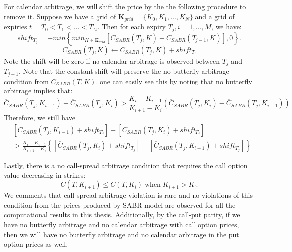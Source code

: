 \documentclass[letterpaper,12pt,titlepage,oneside,final]{book}
\numberwithin{equation}{section}
\theoremstyle{definition}
\begin{document}
For calendar arbitrage, we will shift the price by the the following procedure to remove it. Suppose we have a grid of $\mathbf{K}_{grid}=\{K_0,K_1,\dots,K_{N}\}$ and  a grid of expiries $t=T_0 < T_1 < \dots< T_{M}$. Then for each expiry  $T_j,i=1,\dots,M$, we have:
\[
shift_{T_j}=-min\left\{min_{K \in \mathbf{K}_{grid}}\left[\overline{C}_{SABR}(T_j,K)-\overline{C}_{SABR}(T_{j-1},K)\right],0\right\}.	
\]
\[
\widetilde {C_{SABR}}(T_j,K) \leftarrow \overline{C}_{SABR}(T_j,K)+shift_{T_j}
\]
Note the shift will be zero if no calendar arbitrage is observed between $T_{j}$ and $T_{j-1}$. Note that the constant shift will preserve the no butterfly arbitrage condition from $\overline{C}_{SABR}(T,K)$, one can easily see this by noting that no butterfly arbitrage implies that:	 
\[
\overline{C}_{SABR}(T_{j},K_{i-1})- \overline{C}_{SABR}(T_{j},K_{i}) > \frac{K_i-K_{i-1}}{K_{i+1}-K_{i}}
\left(  \overline{C}_{SABR}(T_{j},K_{i})- \overline{C}_{SABR}(T_{j},K_{i+1})  \right)
\]
Therefore, we still have
\[
\begin{split}
&[\overline{C}_{SABR}(T_{j},K_{i-1})+shift_{T_j}]- [\overline{C}_{SABR}(T_{j},K_{i})+shift_{T_j}] \\
&> \frac{K_i-K_{i-1}}{K_{i+1}-K_{i}}
\left\{  \left[\overline{C}_{SABR}(T_{j},K_{i})+shift_{T_j}\right]- \left[\overline{C}_{SABR}(T_{j},K_{i+1})+shift_{T_j}\right]  \right\}
\end{split}
\]




Lastly, there is a no call-spread arbitrage condition that requires the call option value decreasing in strikes:
\[
C(T,K_{i+1})\leq C(T,K_{i}) \; \text{when} \; K_{i+1}>K_{i}.
\]
We comments that call-spread arbitrage violation is rare and no violations of this condition from the prices produced by SABR model  are observed for all the computational results in this thesis. Additionally, by the call-put parity, if we have no butterfly arbitrage and no calendar arbitrage with call option prices, then we will  have  no butterfly arbitrage and no calendar arbitrage in  the put option prices as well.
\end{document}
